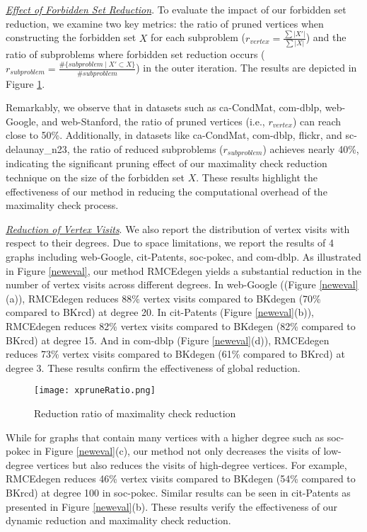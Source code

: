 \documentclass[sigconf, nonacm]{acmart}
\begin{document}
\noindent\textit{{\underline{Effect of Forbidden Set Reduction}}}. To evaluate the impact of our forbidden set reduction, we examine two key metrics: the ratio of pruned vertices when constructing the forbidden set $X$ for each subproblem ($r_{vertex} = \frac{\sum\lvert X'\rvert}{\sum\lvert X\rvert}$) and the ratio of subproblems where forbidden set reduction occurs  ($r_{subproblem}=\frac{\# \{subproblem\mid X'\subset X\}}{\# subproblem}$) in the outer iteration. The results are depicted in Figure \ref{xprune}. 

Remarkably, we observe that in datasets such as ca-CondMat, com-dblp, web-Google, and web-Stanford, the ratio of pruned vertices (i.e., $r_{vertex}$) can reach close to 50\%. Additionally, in datasets like ca-CondMat, com-dblp, flickr, and sc-delaunay\_n23, the ratio of reduced subproblems ($r_{subproblem}$) achieves nearly 40\%, indicating the significant pruning effect of our maximality check reduction technique on the size of the forbidden set $X$. These results highlight the effectiveness of our method in reducing the computational overhead of the maximality check process.




\noindent\textit{{\underline{Reduction of Vertex Visits}}}. We also report the distribution of vertex visits with respect to their degrees. Due to space limitations, we report the results of 4 graphs including web-Google, cit-Patents, soc-pokec, and com-dblp.  
As illustrated in Figure \ref{neweval}, our method RMCEdegen yields a substantial reduction in the number of vertex visits across different degrees. 
In web-Google ((Figure \ref{neweval}(a)), RMCEdegen reduces 88\% vertex visits compared to BKdegen (70\% compared to BKrcd) at degree 20. In cit-Patents (Figure \ref{neweval}(b)), RMCEdegen reduces 82\% vertex visits compared to BKdegen (82\% compared to BKrcd) at degree 15. And in com-dblp (Figure \ref{neweval}(d)), RMCEdegen reduces 73\% vertex visits compared to BKdegen (61\% compared to BKrcd) at degree 3. These results confirm the effectiveness of global reduction.


\begin{figure}[tbp]
\centerline{\texttt{[image: xpruneRatio.png]}}
\vspace{-0.1in}
\caption{Reduction ratio of maximality check reduction}
\label{xprune}
\vspace{-0.1in}
\end{figure}

While for graphs that contain many vertices with a higher degree such as soc-pokec in Figure \ref{neweval}(c), our method not only decreases the visits of low-degree vertices but also reduces the visits of high-degree vertices. For example, RMCEdegen reduces 46\% vertex visits compared to BKdegen (54\% compared to BKrcd) at degree 100 in soc-pokec. Similar results can be seen %
in cit-Patents as presented in Figure \ref{neweval}(b).
These results verify the effectiveness of our dynamic reduction and maximality check reduction.
\end{document}
